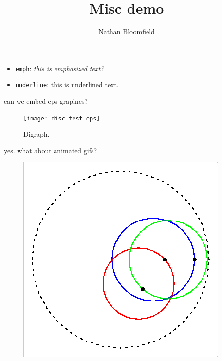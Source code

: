 \documentclass{ximera}
\title{Misc demo}
\author{Nathan Bloomfield}
\begin{document}
\maketitle

\begin{itemize}
\item \texttt{emph}: \emph{this is emphasized text?}
\item \texttt{underline}: \underline{this is underlined text.}
\end{itemize}

can we embed eps graphics?

\begin{figure}[!htb]
\begin{center}
\texttt{[image: disc-test.eps]}
\caption{Digraph.}
\end{center}
\label{fig:digraph}
\end{figure}

yes. what about animated gifs?

\begin{figure}
\begin{center}
\includegraphics{005-ani.gif}
\end{center}
\end{figure}
\end{document}
